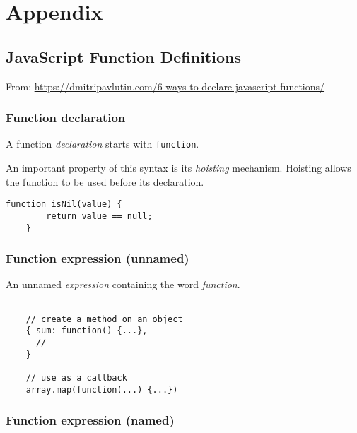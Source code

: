 \documentclass{scrartcl}
\begin{document}
\begin{lstlisting}[style=ES6]

\end{lstlisting}

\begin{lstlisting}[style=ES6]

\end{lstlisting}




\section{Appendix}

\subsection{JavaScript Function Definitions}

From:  \url{https://dmitripavlutin.com/6-ways-to-declare-javascript-functions/}

\subsubsection{Function declaration}

A function \textit{declaration} starts with \lstinline|function|.

An important property of this syntax is its \textit{hoisting} mechanism. Hoisting allows the function to be used before its declaration.

\begin{lstlisting}[style=ES6]
    function isNil(value) {
        return value == null;
    }
\end{lstlisting}

\subsubsection{Function expression (unnamed)}

An unnamed \textit{expression} containing the word \textit{function}.

\begin{lstlisting}[style=ES6]

    // create a method on an object
    { sum: function() {...},
      //
    }

    // use as a callback
    array.map(function(...) {...})

\end{lstlisting}


\subsubsection{Function expression (named)}
\end{document}
